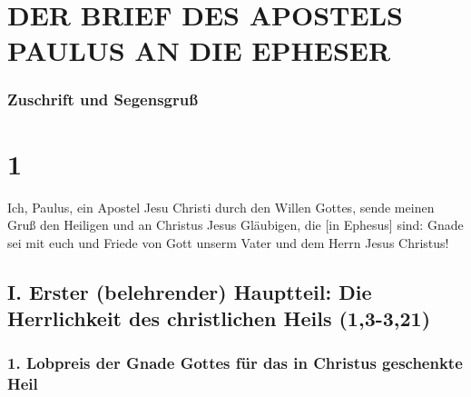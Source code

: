 \hypertarget{der-brief-des-apostels-paulus-an-die-epheser}{%
\section{DER BRIEF DES APOSTELS PAULUS AN DIE
EPHESER}\label{der-brief-des-apostels-paulus-an-die-epheser}}

\hypertarget{zuschrift-und-segensgruuxdf}{%
\subsubsection{Zuschrift und
Segensgruß}\label{zuschrift-und-segensgruuxdf}}

\hypertarget{section}{%
\section{1}\label{section}}

 Ich, Paulus, ein Apostel Jesu Christi durch den Willen
Gottes, sende meinen Gruß den Heiligen und an Christus Jesus Gläubigen,
die {[}in Ephesus{]} sind:  Gnade sei mit euch und Friede
von Gott unserm Vater und dem Herrn Jesus Christus!

\hypertarget{i.-erster-belehrender-hauptteil-die-herrlichkeit-des-christlichen-heils-13-321}{%
\subsection{I. Erster (belehrender) Hauptteil: Die Herrlichkeit des
christlichen Heils
(1,3-3,21)}\label{i.-erster-belehrender-hauptteil-die-herrlichkeit-des-christlichen-heils-13-321}}

\hypertarget{lobpreis-der-gnade-gottes-fuxfcr-das-in-christus-geschenkte-heil}{%
\subsubsection{1. Lobpreis der Gnade Gottes für das in Christus
geschenkte
Heil}\label{lobpreis-der-gnade-gottes-fuxfcr-das-in-christus-geschenkte-heil}}

